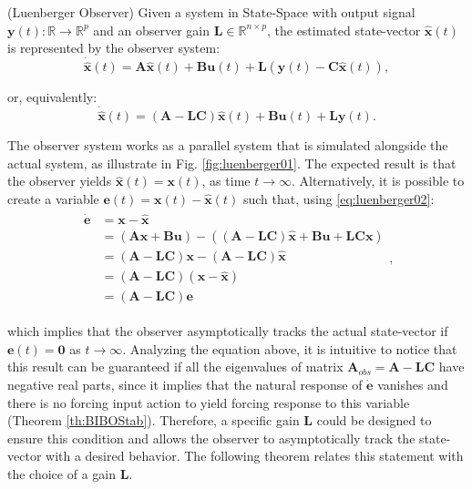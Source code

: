 \documentclass[a4paper,11pt]{book}
\numberwithin{figure}{chapter}
\numberwithin{equation}{chapter}
\numberwithin{table}{chapter}
\theoremstyle{definition}
\newtheorem{definition}{Definition}[chapter]
\newcounter{boxed-theorem}
\newcounter{boxed-lemma}
\newcounter{boxed-definition}
\newenvironment{boxed-definition}[1]
{\colorlet{shadecolor}{pastelYellow!15} \begin{shaded} \begin{definition}{#1}}
{\end{definition} \end{shaded}}
\newcounter{boxed-example}
\begin{document}
\begin{boxed-definition}{(Luenberger Observer)} \label{def:luenberger}
    Given a system in State-Space with output signal $\bm{y}(t) : \mathbb{R} \rightarrow \mathbb{R}^p$ and an observer gain $\bm{L} \in \mathbb{R}^{n \times p}$, the estimated state-vector $\hat{\bm{x}}(t)$ is represented by the observer system:
    \begin{equation}
        \dot{\hat{\bm{x}}}(t) = \bm{A} \hat{\bm{x}}(t) + \bm{B} \bm{u}(t) + \bm{L} \left( \bm{y}(t) - \bm{C} \hat{\bm{x}}(t) \right)
    ,\end{equation}
    
    \noindent or, equivalently:
    \begin{equation} \label{eq:luenberger02}
        \dot{\hat{\bm{x}}}(t) = \left( \bm{A} - \bm{L} \bm{C} \right) \hat{\bm{x}}(t) + \bm{B} \bm{u}(t) + \bm{L} \bm{y}(t)
    .\end{equation}
\end{boxed-definition}

The observer system works as a parallel system that is simulated alongside the actual system, as illustrate in Fig. \ref{fig:luenberger01}. The expected result is that the observer yields $\hat{\bm{x}}(t) = \bm{x}(t)$, as time $t \to \infty$. Alternatively, it is possible to create a variable $\bm{e}(t) = \bm{x}(t) - \hat{\bm{x}}(t)$ such that, using \eqref{eq:luenberger02}:
\begin{align}
\begin{split}
    \dot{\bm{e}} &= \bm{x} - \hat{\bm{x}} \\ 
        &= \left( \bm{A} \bm{x} + \bm{B} \bm{u} \right) - \left( \left( \bm{A} - \bm{L} \bm{C} \right) \hat{\bm{x}} + \bm{B} \bm{u} + \bm{L} \bm{C} \bm{x} \right) \\
        &= \left( \bm{A} - \bm{L} \bm{C} \right) \bm{x} - \left( \bm{A} - \bm{L} \bm{C} \right) \hat{\bm{x}} \\
        &= \left( \bm{A} - \bm{L} \bm{C} \right) \left( \bm{x} - \hat{\bm{x}} \right) \\
        &= \left( \bm{A} - \bm{L} \bm{C} \right) \bm{e}
\end{split}
,\end{align}

\noindent which implies that the observer asymptotically tracks the actual state-vector if $\bm{e}(t) = \bm{0}$ as $t \to \infty$. Analyzing the equation above, it is intuitive to notice that this result can be guaranteed if all the eigenvalues of matrix $\bm{A}_{obs} = \bm{A} - \bm{L} \bm{C}$ have negative real parts, since it implies that the natural response of $\dot{\bm{e}}$ vanishes and there is no forcing input action to yield forcing response to this variable (Theorem \ref{th:BIBOStab}). Therefore, a specific gain $\bm{L}$ could be designed to ensure this condition and allows the observer to asymptotically track the state-vector with a desired behavior. The following theorem relates this statement with the choice of a gain $\bm{L}$.
\end{document}
